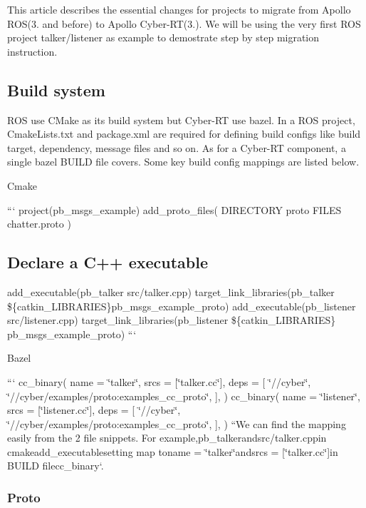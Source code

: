 This article describes the essential changes for projects to migrate from Apollo R\-O\-S(3. and before) to Apollo Cyber-\/\-R\-T(3.). We will be using the very first R\-O\-S project talker/listener as example to demostrate step by step migration instruction.

\subsection*{Build system}

R\-O\-S use {\ttfamily C\-Make} as its build system but Cyber-\/\-R\-T use {\ttfamily bazel}. In a R\-O\-S project, Cmake\-Lists.\-txt and package.\-xml are required for defining build configs like build target, dependency, message files and so on. As for a Cyber-\/\-R\-T component, a single bazel B\-U\-I\-L\-D file covers. Some key build config mappings are listed below.

Cmake

``` project(pb\-\_\-msgs\-\_\-example) add\-\_\-proto\-\_\-files( D\-I\-R\-E\-C\-T\-O\-R\-Y proto F\-I\-L\-E\-S chatter.\-proto ) \subsection*{Declare a C++ executable}

add\-\_\-executable(pb\-\_\-talker src/talker.\-cpp) target\-\_\-link\-\_\-libraries(pb\-\_\-talker \$\{catkin\-\_\-\-L\-I\-B\-R\-A\-R\-I\-E\-S\}pb\-\_\-msgs\-\_\-example\-\_\-proto) add\-\_\-executable(pb\-\_\-listener src/listener.\-cpp) target\-\_\-link\-\_\-libraries(pb\-\_\-listener \$\{catkin\-\_\-\-L\-I\-B\-R\-A\-R\-I\-E\-S\} pb\-\_\-msgs\-\_\-example\-\_\-proto) ```

Bazel

``` cc\-\_\-binary( name = \char`\"{}talker\char`\"{}, srcs = \mbox{[}\char`\"{}talker.\-cc\char`\"{}\mbox{]}, deps = \mbox{[} \char`\"{}//cyber\char`\"{}, \char`\"{}//cyber/examples/proto\-:examples\-\_\-cc\-\_\-proto\char`\"{}, \mbox{]}, ) cc\-\_\-binary( name = \char`\"{}listener\char`\"{}, srcs = \mbox{[}\char`\"{}listener.\-cc\char`\"{}\mbox{]}, deps = \mbox{[} \char`\"{}//cyber\char`\"{}, \char`\"{}//cyber/examples/proto\-:examples\-\_\-cc\-\_\-proto\char`\"{}, \mbox{]}, ) ``{\ttfamily  We can find the mapping easily from the 2 file snippets. For example,}pb\-\_\-talker{\ttfamily and}src/talker.\-cpp{\ttfamily in cmake}add\-\_\-executable{\ttfamily setting map to}name = \char`\"{}talker\char`\"{}{\ttfamily and}srcs = \mbox{[}\char`\"{}talker.\-cc\char`\"{}\mbox{]}{\ttfamily in B\-U\-I\-L\-D file}cc\-\_\-binary`. \subsubsection*{Proto}

